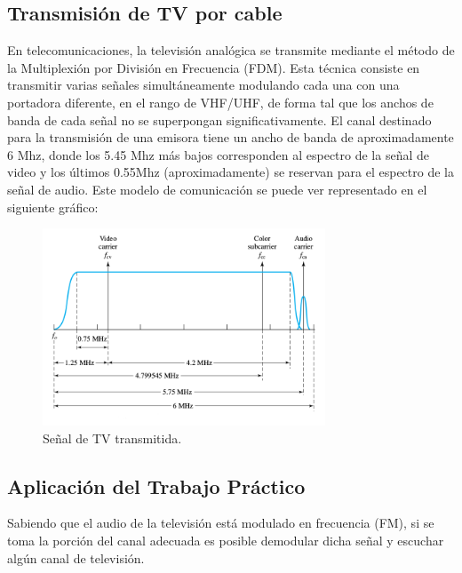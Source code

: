 \documentclass[10pt,a4paper]{article}
\begin{document}
\subsection{Transmisión de TV por cable}

En telecomunicaciones, la televisión analógica se transmite mediante
el método de la Multiplexión por División en Frecuencia (FDM). Esta
técnica consiste en transmitir varias señales simultáneamente modulando
cada una con una portadora diferente, en el rango de VHF/UHF, de forma
tal que los anchos de banda de cada señal no se superpongan significativamente.
El canal destinado para la transmisión de una emisora tiene un ancho
de banda de aproximadamente 6 Mhz, donde los 5.45 Mhz más bajos corresponden
al espectro de la señal de video y los últimos 0.55Mhz (aproximadamente)
se reservan para el espectro de la señal de audio. Este modelo de
comunicación se puede ver representado en el siguiente gráfico:

\begin{figure}
\begin{centering}
\includegraphics[width=0.75\textwidth]{Imagenes/TV_Spectrum.png}
\par\end{centering}

\caption{Señal de TV transmitida.}
\end{figure}



\subsection{Aplicación del Trabajo Práctico}

Sabiendo que el audio de la televisión está modulado en frecuencia
(FM), si se toma la porción del canal adecuada es posible demodular
dicha señal y escuchar algún canal de televisión.
\end{document}
